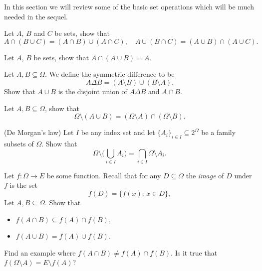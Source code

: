 In this section we will review some of the basic set operations which will be much needed in the sequel. 

\begin{problem} Let $A$, $B$ and $C$ be sets, show that 
    \begin{equation*}
        A\cap (B\cup C) = (A\cap B) \cup (A\cap C),\quad  A\cup (B\cap C) = (A\cup B) \cap (A\cup C).
    \end{equation*}
\end{problem}

\begin{problem} Let $A$, $B$ be sets, show that $A\cap (A\cup B) = A$.    
\end{problem}

\begin{problem} Let $A,B\subseteq \Omega$. We define the symmetric difference to be 
    \begin{equation*}
        A\Delta B = (A\setminus B)\cup (B\setminus A).
    \end{equation*}
    Show that $A\cup B$ is the disjoint union of $A\Delta B$ and $A\cap B$. 
\end{problem}

\begin{problem} Let $A,B\subseteq \Omega$, show that 
    \begin{equation*}
    \Omega\setminus (A\cup B) = (\Omega\setminus A)\cap(\Omega\setminus B).
    \end{equation*}
\end{problem}

\begin{problem} (De Morgan's law) Let $I$ be any index set and let $\{A_i\}_{i\in I}\subseteq 2^\Omega$ be a family subsets of $\Omega$. Show that 
    \begin{equation*}
        \Omega\setminus \bigg(\bigcup_{i\in I} A_i\bigg) = \bigcap_{i\in I} \Omega\setminus A_i. 
    \end{equation*}
\end{problem}


\begin{problem} Let $f:\Omega \to E$ be some function. Recall that for any $D\subseteq \Omega$ the \emph{image} of $D$ under $f$ is the set
    \begin{equation*}
        f(D) = \{f(x) :\,x\in D\},
    \end{equation*}
    Let $A,B\subseteq \Omega$. Show that
    \begin{itemize}
        \item $f(A\cap B) \subseteq f(A)\cap f(B)$,
        \item $f(A\cup B) = f(A)\cup f(B)$.
    \end{itemize}
    Find an example where $f(A\cap B) \neq f(A)\cap f(B)$. Is it true that $f(\Omega\setminus A) = E \setminus f(A)$?
\end{problem}

